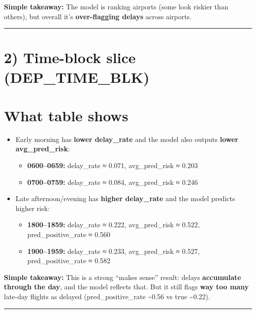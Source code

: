 \documentclass[11pt]{article}
\providecommand{\tightlist}{%
      \setlength{\itemsep}{0pt}\setlength{\parskip}{0pt}}
\begin{document}
\textbf{Simple takeaway:} The model is ranking airports (some look
riskier than others), but overall it's \textbf{over-flagging delays}
across airports.

\begin{center}\rule{0.5\linewidth}{0.5pt}\end{center}

\section{2) Time-block slice
(DEP\_TIME\_BLK)}\label{time-block-slice-dep_time_blk}

\section{What table shows}\label{what-table-shows-1}

\begin{itemize}
\item
  Early morning has \textbf{lower delay\_rate} and the model also
  outputs \textbf{lower avg\_pred\_risk}:

  \begin{itemize}
  \tightlist
  \item
    \textbf{0600--0659:} delay\_rate ≈ 0.071, avg\_pred\_risk ≈ 0.203
  \item
    \textbf{0700--0759:} delay\_rate ≈ 0.084, avg\_pred\_risk ≈ 0.246
  \end{itemize}
\item
  Late afternoon/evening has \textbf{higher delay\_rate} and the model
  predicts higher risk:

  \begin{itemize}
  \tightlist
  \item
    \textbf{1800--1859:} delay\_rate ≈ 0.222, avg\_pred\_risk ≈ 0.522,
    pred\_positive\_rate ≈ 0.560
  \item
    \textbf{1900--1959:} delay\_rate ≈ 0.233, avg\_pred\_risk ≈ 0.527,
    pred\_positive\_rate ≈ 0.582
  \end{itemize}
\end{itemize}

\textbf{Simple takeaway:} This is a strong ``makes sense'' result:
delays \textbf{accumulate through the day}, and the model reflects that.
But it still flags \textbf{way too many} late-day flights as delayed
(pred\_positive\_rate \textasciitilde0.56 vs true \textasciitilde0.22).

\begin{center}\rule{0.5\linewidth}{0.5pt}\end{center}
\end{document}
